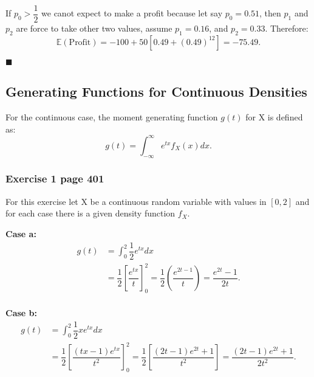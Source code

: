 \documentclass[10pt,leter,openany]{article}
\begin{document}
		
		If $p_{0} > \dfrac{1}{2}$ we canot expect to make a profit because let say $p_{0}=0.51$, then $ p_{1} $ and $ p_{2 }$ are force to take other two values, assume $p_{1}=0.16$, and $p_{2}=0.33$. Therefore: \begin{equation*}
			\mathbb{E}(\mbox{Profit}) = -100 + 50\left[ 0.49+\left( 0.49\right) ^{12}\right]  = -75.49.
		\end{equation*}

						\begin{flushright}
						$\blacksquare $ 
						\end{flushright}
					
		\subsection{Generating Functions for Continuous Densities}
	
			For the continuous case, the moment generating function $ g(t) $ for X is defined as: \begin{equation}
				g(t) = \int_{-\infty}^{\infty}e^{tx} f_{X}(x)  dx.
			\end{equation}
		
		\subsubsection{Exercise 1 page 401}
			
			For this exercise let X be a continuous random variable with values in $ \left[ 0, 2\right]  $ and for each case there is a given density function $ f_{X}$.
			
			\textbf{Case a:} 	\begin{equation*}
				\begin{aligned}
					g(t) & = \int_{0}^{2} \dfrac{1}{2}e^{tx} dx\\
					& = \dfrac{1}{2}\left[ \dfrac{e^{ tx}}{t}\right]^{2}_{0} = \dfrac{1}{2} \left(    \dfrac{e^{2t-1}}{t} \right) = \dfrac{e ^{2t} -1}{2t}.\\
				\end{aligned}	
			\end{equation*}
		
		
			\textbf{Case b:} 	\begin{equation*}
				\begin{aligned}
					g(t) & = \int_{0}^{2} \dfrac{1}{2}xe^{tx} dx\\
					& = \dfrac{1}{2}\left[ \dfrac{(tx-1)e^{ tx}}{t^{2}}\right] ^{2}_{0} = \dfrac{1}{2} \left[    \dfrac{(2t-1)e^{2t}+1}{t^{2}} \right] = \dfrac{(2t-1)e^{2t} +1}{2t^{2}}.\\
				\end{aligned}	
			\end{equation*}
		
\end{document}

